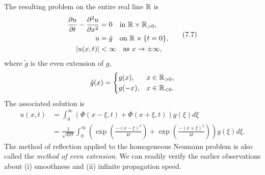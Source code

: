 The resulting problem on the entire real line $\mathbb{R}$ is
\begin{equation*}
    \begin{aligned}
        \frac{\partial u}{\partial t} - \frac{\partial^2 u}{\partial x^2} &= 0 \quad \text{in } \mathbb{R} \times \mathbb{R}_{>0}, \\
        u &= \tilde{g} \quad \text{on } \mathbb{R} \times \{t = 0\}, \\
        |u(x, t)| &< \infty \quad \text{as } x \to \pm\infty,
    \end{aligned} \tag{7.7}
\end{equation*}
where $\tilde{g}$ is the even extension of $g$,
\[\tilde{g}(x) = \begin{cases} g(x), & x \in \mathbb{R}_{>0}, \\ g(-x), & x \in \mathbb{R}_{<0}. \end{cases}\]
The associated solution is
\begin{align*}
    u(x, t) &= \int_0^{\infty} \left(\Phi(x - \xi, t) + \Phi(x + \xi, t)\right) g(\xi) d\xi \\
    &= \frac{1}{\sqrt{4\pi t}} \int_0^{\infty} \left(\exp\left(\frac{-(x - \xi)^2}{4t}\right) + \exp\left(\frac{-(x + \xi)^2}{4t}\right)\right) g(\xi) d\xi.
\end{align*}
The method of reflection applied to the homogeneous Neumann problem is also called the \textit{method of even extension}. We can readily verify the earlier observations about (i) smoothness and (ii) infinite propagation speed.

